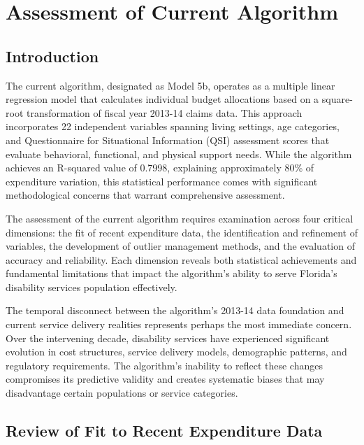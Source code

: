 \chapter{Assessment of Current Algorithm}  \newpage

\section{Introduction}

The current algorithm, designated as Model 5b, operates as a multiple linear regression model that calculates individual budget allocations based on a square-root transformation of fiscal year 2013-14 claims data. This approach incorporates 22 independent variables spanning living settings, age categories, and Questionnaire for Situational Information (QSI) assessment scores that evaluate behavioral, functional, and physical support needs. While the algorithm achieves an R-squared value of 0.7998, explaining approximately 80\% of expenditure variation, this statistical performance comes with significant methodological concerns that warrant comprehensive assessment.

The assessment of the current algorithm requires examination across four critical dimensions: the fit of recent expenditure data, the identification and refinement of variables, the development of outlier management methods, and the evaluation of accuracy and reliability. Each dimension reveals both statistical achievements and fundamental limitations that impact the algorithm's ability to serve Florida's disability services population effectively.

The temporal disconnect between the algorithm's 2013-14 data foundation and current service delivery realities represents perhaps the most immediate concern. Over the intervening decade, disability services have experienced significant evolution in cost structures, service delivery models, demographic patterns, and regulatory requirements. The algorithm's inability to reflect these changes compromises its predictive validity and creates systematic biases that may disadvantage certain populations or service categories.

\section{Review of Fit to Recent Expenditure Data}

